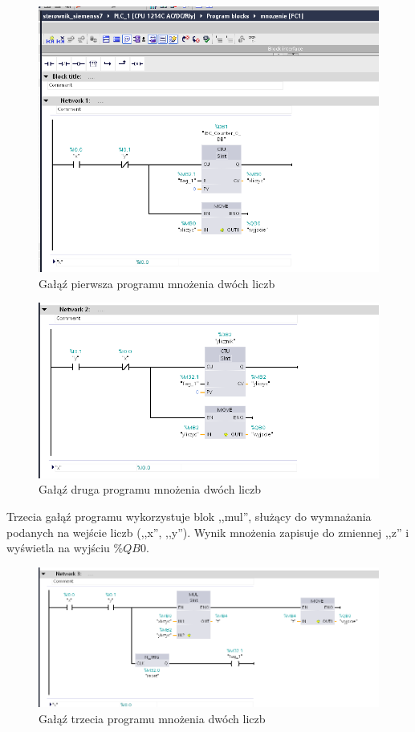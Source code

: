 \documentclass[12pt]{article}
\begin{document}
\begin{figure}[H]
    \centering
    \includegraphics[width=\textwidth]{./zdj/network1.png}
    \caption{Gałąź pierwsza programu mnożenia dwóch liczb}
    \label{network1}
\end{figure} 

\begin{figure}[H]
    \centering
    \includegraphics[width=\textwidth]{./zdj/network2.png}
    \caption{Gałąź druga programu mnożenia dwóch liczb}
    \label{network2}
\end{figure} 

Trzecia gałąź programu wykorzystuje blok ,,mul'', służący do wymnażania podanych na wejście liczb (,,x'', ,,y''). Wynik mnożenia zapisuje do zmiennej ,,z'' i wyświetla na wyjściu $\%QB0$. 

\begin{figure}[H]
    \centering
    \includegraphics[width=\textwidth]{./zdj/network3.png}
    \caption{Gałąź trzecia programu mnożenia dwóch liczb}
    \label{network3}
\end{figure} 
\end{document}

